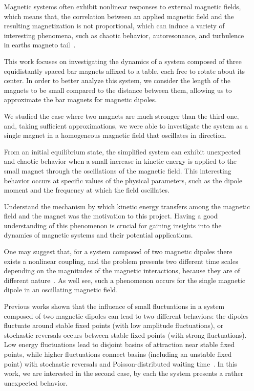 Magnetic systems often exhibit nonlinear responses to external magnetic fields, which means that, the correlation between an applied magnetic field and the resulting magnetization is not proportional, which can induce a variety of interesting phenomena, such as chaotic behavior, autoresonance, and turbulence in earth\textquotesingle s magneto tail~\cite{nonlinearResponse,Bratman1983,Loeb1986,VerandaM,Brunton2017,Chang1999}. 


This work focuses on investigating the dynamics of a system composed of three equidistantly spaced bar magnets affixed to a table, each free to rotate about its center. In order to better analyze this system, we consider the length of the magnets to be small compared to the distance between them, allowing us to approximate the bar magnets for magnetic dipoles.

We studied the case where two magnets are much stronger than the third one, and, taking sufficient approximations, we were able to investigate the system as a single magnet in a homogeneous magnetic field that oscillates in direction.

From an initial equilibrium state, the simplified system can exhibit unexpected and chaotic behavior when a small increase in kinetic energy is applied to the small magnet through the oscillations of the magnetic field. This interesting behavior occurs at specific values of the physical parameters, such as the dipole moment and the frequency at which the field oscillates.

Understand the mechanism by which kinetic energy transfers among the magnetic field and the magnet was the motivation to this project. Having a good understanding of this phenomenon is crucial for gaining insights into the dynamics of magnetic systems and their potential applications.

One may suggest that, for a system composed of two magnetic dipoles there exists a nonlinear coupling, and the problem presents two different time scales depending on the magnitudes of the magnetic interactions, because they are of different nature~\cite{LAROZE20081440}. As we\textquotesingle ll see, such a phenomenon occurs for the single magnetic dipole in an oscillating magnetic field. 

Previous works shown that the influence of small fluctuations in a system composed of two magnetic dipoles can lead to two different behaviors: the dipoles fluctuate around stable fixed points (with low amplitude fluctuations), or stochastic reversals occurs between stable fixed points (with strong fluctuations). Low energy fluctuations lead to disjoint basins of attraction near stable fixed points, while higher fluctuations connect basins (including an unstable fixed point) with stochastic reversals and Poisson-distributed waiting time~\cite{StochasticReversalDynamics}. In this work, we are interested in the second case, by each the system presents a rather unexpected behavior.  

